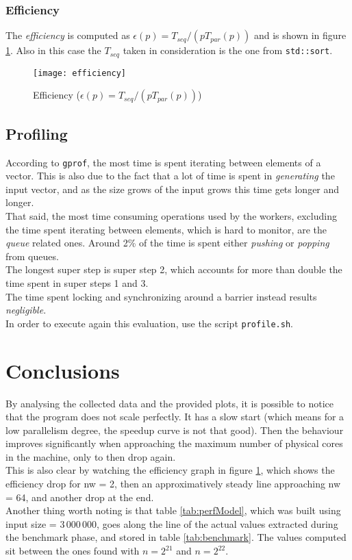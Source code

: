 \documentclass[]{article}
\def\code#1{\texttt{#1}}
\begin{document}
\subsubsection{Efficiency}
The \emph{efficiency} is computed as $\epsilon(p) = T_{seq}/(pT_{par}(p))$ and is shown in figure \ref{fig:effic}. Also in this case the $T_{seq}$ taken in consideration is the one from \code{std::sort}.
\begin{figure}[H]
	\centering
	\texttt{[image: efficiency]}
	\caption{Efficiency ($\epsilon(p) = T_{seq}/(pT_{par}(p))$)}
	\label{fig:effic}
\end{figure}

\subsection{Profiling}
\label{sec:profile}
According to \code{gprof}, the most time is spent iterating between elements of a vector. This is also due to the fact that a lot of time is spent in \emph{generating} the input vector, and as the size grows of the input grows this time gets longer and longer. \\
That said, the most time consuming operations used by the workers, excluding the time spent iterating between elements, which is hard to monitor, are the \emph{queue} related ones.
Around 2\% of the time is spent either \emph{pushing} or \emph{popping} from queues. \\
The longest super step is super step 2, which accounts for more than double the time spent in super steps 1 and 3.\\
The time spent locking and synchronizing around a barrier instead results \emph{negligible}. \\
In order to execute again this evaluation, use the script \code{profile.sh}.

\section{Conclusions}
\label{sec:conclusion}
By analysing the collected data and the provided plots, it is possible to notice that the program does not scale perfectly. It has a slow start (which means for a low parallelism degree, the speedup curve is not that good). Then the behaviour improves significantly when approaching the maximum number of physical cores in the machine, only to then drop again. \\
This is also clear by watching the efficiency graph in figure \ref{fig:effic}, which shows the efficiency drop for nw = 2, then an approximatively steady line approaching nw = 64, and another drop at the end. \\

Another thing worth noting is that table \ref{tab:perfModel}, which was built using input size = $3\,000\,000$, goes along the line of the actual values extracted during the benchmark phase, and stored in table \ref{tab:benchmark}. The values computed sit between the ones found with $n=2^{21}$ and $ n=2^{22}$.
\end{document}
